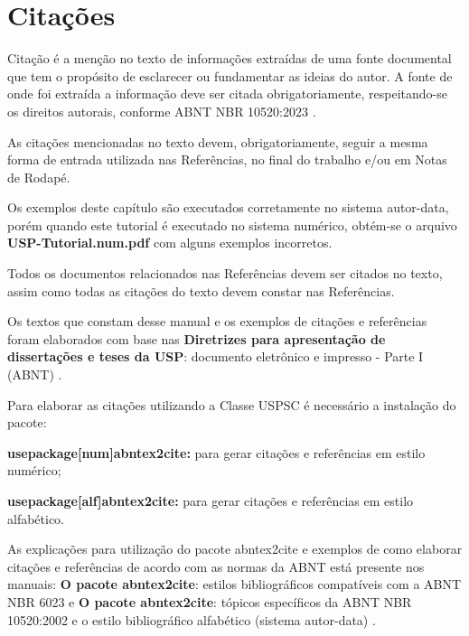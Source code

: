 

\chapter{Citações}
\label{Citações}
Citação é a menção no texto de informações extraídas de uma fonte documental que tem o propósito de esclarecer ou fundamentar as ideias do autor. A fonte de onde foi extraída a informação deve ser citada obrigatoriamente, respeitando-se os direitos autorais, conforme ABNT NBR 10520:2023 \cite{nbr10520}.

As citações mencionadas no texto devem, obrigatoriamente, seguir a mesma forma de entrada utilizada nas Referências, no final do trabalho e/ou em Notas de Rodapé.

Os exemplos deste capítulo são executados corretamente no sistema autor-data, porém quando este tutorial é executado no sistema numérico, obtém-se o arquivo \textbf{USP-Tutorial.num.pdf} com alguns exemplos incorretos.

Todos os documentos relacionados nas Referências devem ser citados no texto, assim como todas as citações do texto devem constar nas Referências. 

Os textos que constam desse manual e os exemplos de citações e referências foram elaborados com base nas \textbf{Diretrizes para apresentação de dissertações e teses da USP}: documento eletrônico e impresso - Parte I (ABNT) \cite{sibi2016}.

Para elaborar as citações utilizando a Classe USPSC é necessário a instalação do pacote: 

\begin{alineas}
	\item \textbf{usepackage[num]abntex2cite:} para gerar citações e referências em estilo numérico;
	\item \textbf{usepackage[alf]abntex2cite:} para gerar citações e referências em estilo alfabético.
\end{alineas}

As explicações para utilização do pacote abntex2cite e exemplos de como elaborar citações e referências de acordo com as normas da ABNT está presente nos manuais: \textbf{O pacote abntex2cite}: estilos bibliográficos compatíveis com a ABNT NBR 6023 \cite{abnetxcite} e  \textbf{O pacote abntex2cite}: tópicos específicos da ABNT NBR 10520:2002 e o estilo bibliográfico alfabético (sistema autor-data) \cite{abnetxcitealf}. 

